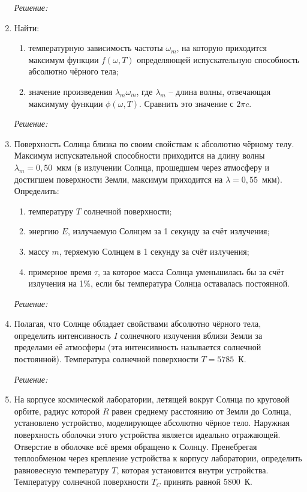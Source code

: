 \begin{enumerate}
\emph{Решение:}

\newpage

\item Найти:
\begin{enumerate}
    \item температурную зависимость частоты \( \omega_m \), на которую
    приходится максимум функции \( f(\omega, T) \) определяющей испускательную
    способность абсолютно чёрного тела;
    \item значение произведения \( \lambda_m\omega_m \), где \( \lambda_m \) --
    длина волны, отвечающая максимуму функции \( \phi(\omega, T) \). Сравнить
    это значение с \( 2\pi c \).
\end{enumerate}

\emph{Решение:}

\newpage

\item Поверхность Солнца близка по своим свойствам к абсолютно чёрному телу.
Максимум испускательной способности приходится на длину волны \( \lambda_m =
0,\!50 \)~мкм (в излучении Солнца, прошедшем через атмосферу и достигшем
поверхности Земли, максимум приходится на \( \lambda = 0,\!55 \)~мкм).
Определить:
\begin{enumerate}
    \item температуру \( T \) солнечной поверхности;
    \item энергию \( E \), излучаемую Солнцем за 1 секунду за счёт излучения;
    \item массу \( m \), теряемую Солнцем в 1 секунду за счёт излучения;
    \item примерное время \( \tau \), за которое масса Солнца уменьшилась бы за
    счёт излучения на 1\%, если бы температура Солнца оставалась постоянной.
\end{enumerate}

\emph{Решение:}

\newpage

\item Полагая, что Солнце обладает свойствами абсолютно чёрного тела,
определить интенсивность \( I \) солнечного излучения вблизи Земли за пределами
её атмосферы (эта интенсивность называется солнечной постоянной). Температура
солнечной поверхности \( T = 5785 \)~К.

\emph{Решение:}

\newpage

\item На корпусе космической лаборатории, летящей вокруг Солнца по круговой
орбите, радиус которой \( R \) равен среднему расстоянию от Земли до Солнца,
установлено устройство, моделирующее абсолютно чёрное тело. Наружная поверхность
оболочки этого устройства является идеально отражающей. Отверстие в оболочке всё
время обращено к Солнцу. Пренебрегая теплообменом через крепление устройства к
корпусу лаборатории, определить равновесную температуру \( T \), которая установится
внутри устройства. Температуру солнечной поверхности \( T_C \) принять равной 5800~К.


\end{enumerate}
